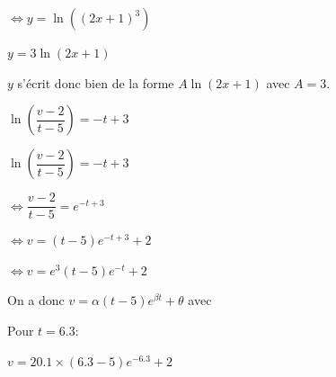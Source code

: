 \documentclass[a4paper,12pt]{scrartcl}
\begin{document}
$\Leftrightarrow y = \ln \left( (2x+1)^{3} \right)$

$y = 3 \ln(2x+1)$

$y$ s'écrit donc bien de la forme $A \ln(2x+1)$ avec $A = 3$.

\exo{}

$\ln \left( \dfrac{v-2}{t-5} \right) = -t+3$

\question{}

$\ln \left( \dfrac{v-2}{t-5} \right) = -t+3$

$\Leftrightarrow \dfrac{v-2}{t-5} = e^{-t+3}$

$\Leftrightarrow v = (t-5)e^{-t+3} + 2$

$\Leftrightarrow v = e^{3}(t-5)e^{-t} + 2$

On a donc $v = \alpha (t-5) e^{\beta t} + \theta$ avec 

\question{}

Pour $t = 6.3$: 

$v = 20.1 \times (6.3-5)e^{-6.3} + 2$



\trait
\end{document}
